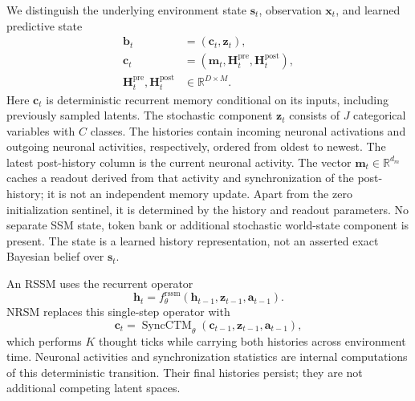 \documentclass{article}
\begin{document}
We distinguish the underlying environment state $\mathbf s_t$, observation $\mathbf x_t$, and learned predictive state
\begin{equation}
\begin{split}
\mathbf b_t&=(\mathbf c_t,\mathbf z_t),\\
\mathbf c_t&=(\mathbf m_t,\mathbf H_t^{\mathrm{pre}},\mathbf H_t^{\mathrm{post}}),\\
\mathbf H_t^{\mathrm{pre}},\mathbf H_t^{\mathrm{post}}&\in\mathbb R^{D\times M}.
\end{split}
\label{eq:world_model_state}
\end{equation}
Here $\mathbf c_t$ is deterministic recurrent memory conditional on its inputs, including previously sampled latents. The stochastic component $\mathbf z_t$ consists of $J$ categorical variables with $C$ classes. The histories contain incoming neuronal activations and outgoing neuronal activities, respectively, ordered from oldest to newest. The latest post-history column is the current neuronal activity. The vector $\mathbf m_t\in\mathbb R^{d_m}$ caches a readout derived from that activity and synchronization of the post-history; it is not an independent memory update. Apart from the zero initialization sentinel, it is determined by the history and readout parameters. No separate SSM state, token bank or additional stochastic world-state component is present. The state is a learned history representation, not an asserted exact Bayesian belief over $\mathbf s_t$.

An RSSM uses the recurrent operator
\begin{equation}
\mathbf h_t=f_\theta^{\mathrm{rssm}}(\mathbf h_{t-1},\mathbf z_{t-1},\mathbf a_{t-1}).
\label{eq:rssm_deterministic}
\end{equation}
NRSM replaces this single-step operator with
\begin{equation}
\mathbf c_t=\operatorname{SyncCTM}_\theta
(\mathbf c_{t-1},\mathbf z_{t-1},\mathbf a_{t-1}),
\label{eq:ct_prior_context}
\end{equation}
which performs $K$ thought ticks while carrying both histories across environment time. Neuronal activities and synchronization statistics are internal computations of this deterministic transition. Their final histories persist; they are not additional competing latent spaces.
\end{document}
